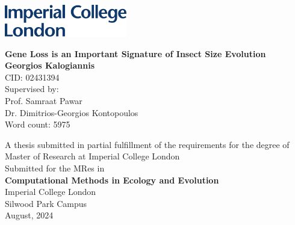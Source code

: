 \documentclass[11pt]{article}
\begin{document}
\begin{titlepage}
    \includegraphics[width=0.4\textwidth]{figures/IC_Logo-2.pdf}\\
    \begin{center}
    \vspace{1.75cm}
    \Large
        \LARGE
        \textbf{Gene Loss is an Important Signature of Insect Size Evolution}
        \Large
        \vspace{2.5cm}\\
        \textbf{Georgios Kalogiannis}\\
        CID: 02431394\\
        \vspace{2.5cm}
        \large
        Supervised by:\\
        Prof. Samraat Pawar\\
        Dr. Dimitrios-Georgios Kontopoulos\\
        \vspace{2cm}
        Word count: 5975 \\
        \vspace{1.5cm}

        
        A thesis submitted in partial fulfillment of the requirements for the degree of\\
        
        Master of Research at Imperial College London\\
        \vspace{0.75cm}
        Submitted for the MRes in\\
        \textbf{Computational Methods in Ecology and Evolution}\\
        \vspace{1.5cm}
        Imperial College London\\
        Silwood Park Campus\\
        \vspace{0.25cm}
        August, 2024
    \end{center}
\end{titlepage}
\pagebreak

\onehalfspacing
{}
\end{document}
